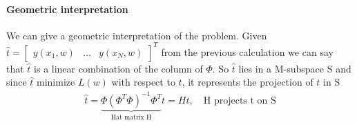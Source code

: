 \documentclass[main.tex]{subfiles}
\begin{document}
\newpage
\paragraph{Geometric interpretation}
We can give a geometric interpretation of the problem. Given $\hat{t}=\begin{bmatrix}y(x_1,w) & \dots & y(x_N,w)\end{bmatrix}^T$ from the previous calculation we can say that $\hat{t}$ is a linear combination of the column of $\Phi$. So $\hat{t}$ lies in a M-subspace S and since $\hat{t}$ minimize $L(w)$ with respect to $t$, it represents the projection of $t$ in S
\begin{align*}
    \hat{t}=\underbrace{\Phi(\Phi^T\Phi)^{-1}\Phi^T}_{\text{Hat matrix H}}t=Ht, \quad \text{H projects t on S}
\end{align*}
\end{document}
